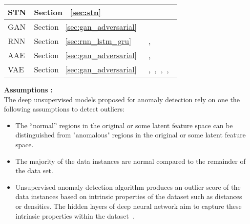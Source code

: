 \begin{table*}
\begin{center}
\begin{tabular}{ | l | p{2cm} | p{6cm} |}
     STN & Section ~\ref{sec:stn} & ~\cite{chianucci2016unsupervised}\\\hline
     GAN & Section ~\ref{sec:gan_adversarial} & ~\cite{lawson2017finding} \\\hline
     RNN & Section ~\ref{sec:rnn_lstm_gru} & ~\cite{dasigi2014modeling},\cite{filonov2017rnn} \\\hline
     AAE & Section ~\ref{sec:gan_adversarial} & ~\cite{dimokranitou2017adversarial},~\cite{leveau2017adversarial} \\\hline
     VAE & Section ~\ref{sec:gan_adversarial} &  ~\cite{an2015variational},~\cite{suh2016echo},~\cite{solch2016variational},~\cite{xu2018unsupervised},~\cite{mishra2017generative}\\\hline
    \end{tabular}
\end{center}
\end{table*}


\textbf{Assumptions : } \\
The deep unsupervised  models proposed for anomaly detection rely on one the following assumptions to detect outliers:
\begin{itemize}
 \item The “normal” regions in the original or some latent feature space can be distinguished from "anomalous" regions in the original or some latent feature space.
  \item The majority of the data instances are normal compared to the remainder of the data set.
  \item Unsupervised anomaly detection algorithm produces an outlier score of the data instances based on  intrinsic properties of the dataset such as distances or densities. The hidden layers of deep neural network aim to capture these intrinsic properties within the dataset~\cite{goldstein2016comparative}.
\end{itemize}

